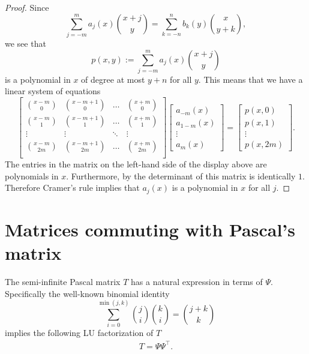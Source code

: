 \documentclass[11pt]{amsart}
\theoremstyle{plain}
\newcommand{\cleqn}{\setcounter{equation}{0}}
\newcommand{\clth}{\setcounter{theorem}{0}}
\newcommand {\sectionnew}[1]{\section{#1}\cleqn\clth}
\theoremstyle{named}
\def \p  {\mathfrak{p}}
\begin{document}
\begin{proof}
Since
$$\sum_{j=-m}^m a_j(x)\binom{x+j}{y} = \sum_{k=-n}^n b_k(y)\binom{x}{y+k},$$
we see that
$$p(x,y) := \sum_{j=-m}^m  a_j(x) \binom{x+j}{y}$$
is a polynomial in $x$ of degree at most $y+n$ for all $y$.
This means that we have a linear system of equations
$$\left[\begin{array}{cccc}
\binom{x-m}{0} & \binom{x-m+1}{0} & \dots & \binom{x+m}{0}\\
\binom{x-m}{1} & \binom{x-m+1}{1} & \dots & \binom{x+m}{1}\\
\vdots & \vdots & \ddots & \vdots\\
\binom{x-m}{2m} & \binom{x-m+1}{2m} & \dots & \binom{x+m}{2m}\\
\end{array}\right]
\left[\begin{array}{c}
a_{-m}(x) \\ a_{1-m}(x)\\\vdots\\a_m(x)
\end{array}\right]
= \left[\begin{array}{c}
p(x,0) \\ p(x,1)\\\vdots\\p(x,2m)
\end{array}\right].$$
The entries in the matrix on the left-hand side of the display above are polynomials in $x$.  Furthermore, by \cite[Theorem 2.1]{Helou} the determinant of this matrix is identically $1$.
Therefore Cramer's rule implies that $a_j(x)$ is a polynomial in $x$ for all $j$.
\end{proof}

\sectionnew{Matrices commuting with Pascal's matrix}
The semi-infinite Pascal matrix $T$ has a natural expression in terms of $\Psi$.  Specifically the well-known binomial identity \cite[Equation 3.13]{spiegel}
$$\sum_{i=0}^{\min(j,k)} \binom{j}{i}\binom{k}{i} = \binom{j+k}{k}$$
implies the following LU factorization of $T$ %
\begin{align}
T = \Psi\Psi^\intercal.
\end{align}
\end{document}
